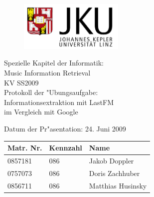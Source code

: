 
\begin{titlepage}

\begin{figure}[h!]
	\centering
  \includegraphics[width=5cm]{JKULogokurzWappenlinks_ger.jpg}
\end{figure}

\begin{center}
\vspace*{1.3cm}
{\Large Spezielle Kapitel der Informatik:\\Music Information Retrieval\\KV SS2009\\}
\vspace{4cm}
{ Protokoll der "Ubungsaufgabe:\\}{\huge Informationsextraktion mit LastFM \\ im Vergleich mit Google\\}
\vspace{4 cm}

{\Large Datum der Pr"asentation: 24. Juni 2009}
\vspace{0.5cm}


\begin{table}[h!]
\centering
\begin{tabular}{|p{3.5cm}|p{3.5cm}|p{6.5cm}|}
\hline \textbf{Matr. Nr.} & \textbf{Kennzahl} & \textbf{Name} \\
\hline
0857181 & 086 & Jakob Doppler\\
\hline
0757073 & 086 & Doris Zachhuber\\
\hline
0856711 & 086 & Matthias Husinsky\\
\hline
\end{tabular}
\end{table}

\end{center}

\end{titlepage}
\setcounter{page}{2}

